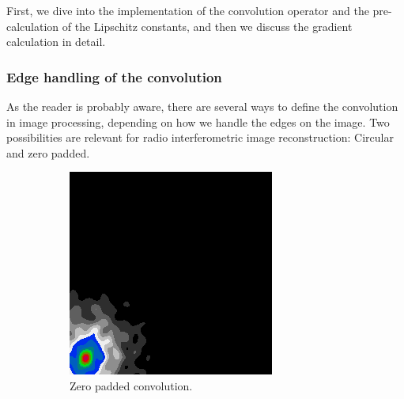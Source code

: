 First, we dive into the implementation of the convolution operator and the pre-calculation of the Lipschitz constants, and then we discuss the gradient calculation in detail.

\subsubsection{Edge handling of the convolution}
As the reader is probably aware, there are several ways to define the convolution in image processing, depending on how we handle the edges on the image. Two possibilities are relevant for radio interferometric image reconstruction: Circular and zero padded.

\begin{figure}[h]
	\centering
	\begin{subfigure}[b]{0.3\linewidth}
		\includegraphics[width=\linewidth]{./chapters/03.distribution/simulated/padded.png}
		\caption{Zero padded convolution.}
		\label{cd:efficient:convolution:padded}
	\end{subfigure}
	\begin{subfigure}[b]{0.3\linewidth}

\end{subfigure}
\end{figure}
